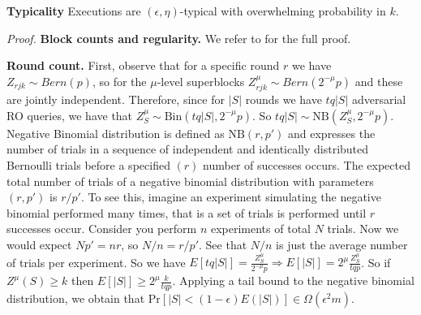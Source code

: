 \begin{thm}{\textbf{Typicality}}
	Executions are $(\epsilon, \eta)$-typical with overwhelming probability in $k$.
\end{thm}
\textit{Proof.} \textbf{Block counts and regularity.} We refer to \cite{Backbone} for
the full proof.

\textbf{Round count.} First, observe that for a specific round $r$ we have $Z_{rjk}
\sim Bern(p)$, so for the $\mu$-level superblocks $Z_{rjk}^\mu \sim Bern(2^{-\mu}p)$
and these are jointly independent. Therefore, since for $\vert S \vert$ rounds we
have $tq\vert S \vert$ adversarial RO queries, we have that $Z_S^\mu \sim
\text{Bin}(tq \vert S \vert, 2^{-\mu}p)$. So $tq \vert S \vert \sim
\text{NB}(Z_S^\mu, 2^{-\mu}p)$. Negative Binomial distribution is defined
as $\text{NB}(r, p')$ and expresses the number of trials in a sequence of
independent and identically distributed Bernoulli trials before a specified
$(r)$ number of successes occurs. The expected total number of trials of a
negative binomial distribution with parameters $(r, p')$ is $r/p'$. To see
this, imagine an experiment simulating the negative binomial performed many
times, that is a set of trials is performed until $r$ successes occur. Consider
you perform $n$ experiments of total $N$ trials. Now we would expect $Np' = nr$,
so $N/n = r/p'$. See that $N/n$ is just the average number of trials per
experiment. So we have $E[tq \vert S \vert] = \frac{Z^\mu_S}{2^{-\mu}p}
\Rightarrow E[\vert S \vert] = 2^\mu \frac{Z^\mu_S}{tqp}$. So if $Z^\mu(S) \geq k$
then $E[\vert S \vert] \geq 2^\mu \frac{k}{tqp}$. Applying a tail bound to the
negative binomial distribution, we obtain that $\text{Pr}[\vert S \vert < (1 -
\epsilon)E(\vert S \vert)] \in \Omega(\epsilon^{2}m)$.  \\

